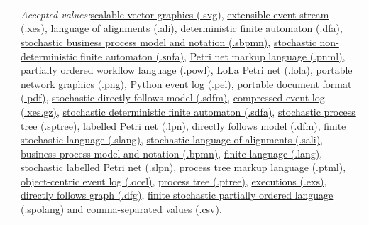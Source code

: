 {\begin{tabularx}{\linewidth}{lX}
&\textit{Accepted values:}\quad \hyperref[filehandler:scalable vector graphics]{scalable vector graphics (.svg)}, \hyperref[filehandler:extensible event stream]{extensible event stream (.xes)}, \hyperref[filehandler:language of alignments]{language of alignments (.ali)}, \hyperref[filehandler:deterministic finite automaton]{deterministic finite automaton (.dfa)}, \hyperref[filehandler:stochastic business process model and notation]{stochastic business process model and notation (.sbpmn)}, \hyperref[filehandler:stochastic non-deterministic finite automaton]{stochastic non-deterministic finite automaton (.snfa)}, \hyperref[filehandler:Petri net markup language]{Petri net markup language (.pnml)}, \hyperref[filehandler:partially ordered workflow language]{partially ordered workflow language (.powl)}, \hyperref[filehandler:LoLa Petri net]{LoLa Petri net (.lola)}, \hyperref[filehandler:portable network graphics]{portable network graphics (.png)}, \hyperref[filehandler:Python event log]{Python event log (.pel)}, \hyperref[filehandler:portable document format]{portable document format (.pdf)}, \hyperref[filehandler:stochastic directly follows model]{stochastic directly follows model (.sdfm)}, \hyperref[filehandler:compressed event log]{compressed event log (.xes.gz)}, \hyperref[filehandler:stochastic deterministic finite automaton]{stochastic deterministic finite automaton (.sdfa)}, \hyperref[filehandler:stochastic process tree]{stochastic process tree (.sptree)}, \hyperref[filehandler:labelled Petri net]{labelled Petri net (.lpn)}, \hyperref[filehandler:directly follows model]{directly follows model (.dfm)}, \hyperref[filehandler:finite stochastic language]{finite stochastic language (.slang)}, \hyperref[filehandler:stochastic language of alignments]{stochastic language of alignments (.sali)}, \hyperref[filehandler:business process model and notation]{business process model and notation (.bpmn)}, \hyperref[filehandler:finite language]{finite language (.lang)}, \hyperref[filehandler:stochastic labelled Petri net]{stochastic labelled Petri net (.slpn)}, \hyperref[filehandler:process tree markup language]{process tree markup language (.ptml)}, \hyperref[filehandler:object-centric event log]{object-centric event log (.ocel)}, \hyperref[filehandler:process tree]{process tree (.ptree)}, \hyperref[filehandler:executions]{executions (.exs)}, \hyperref[filehandler:directly follows graph]{directly follows graph (.dfg)}, \hyperref[filehandler:finite stochastic partially ordered language]{finite stochastic partially ordered language (.spolang)} and \hyperref[filehandler:comma-separated values]{comma-separated values (.csv)}.\\

\end{tabularx}}
